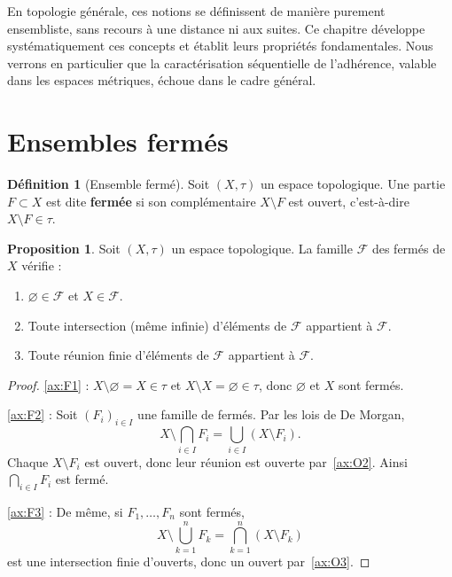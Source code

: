 \documentclass[12pt,a4paper,openany]{book}
\theoremstyle{definition}
\newtheorem{definition}{Définition}[chapter]
\theoremstyle{cours}
\newtheorem{proposition}[theoreme]{Proposition}
\theoremstyle{coursnormal}
\begin{document}
En topologie générale, ces notions se définissent de manière purement ensembliste, sans recours à une distance ni aux suites. Ce chapitre développe systématiquement ces concepts et établit leurs propriétés fondamentales. Nous verrons en particulier que la caractérisation séquentielle de l'adhérence, valable dans les espaces métriques, échoue dans le cadre général.

\section{Ensembles fermés}
\label{sec:fermes}

\begin{definition}[Ensemble fermé]\label{def:ferme}
  Soit $(X,\tau)$ un espace topologique. Une partie $F \subset X$ est dite \textbf{fermée} si son complémentaire $X \setminus F$ est ouvert, c'est-à-dire $X \setminus F \in \tau$.
\end{definition}

\begin{proposition}\label{prop:proprietes-fermes}
  Soit $(X,\tau)$ un espace topologique. La famille $\mathcal{F}$ des fermés de $X$ vérifie :
  \begin{enumerate}[label=\textbf{(F\arabic*)}]
    \item\label{ax:F1} $\varnothing \in \mathcal{F}$ et $X \in \mathcal{F}$.
    \item\label{ax:F2} Toute intersection (même infinie) d'éléments de $\mathcal{F}$ appartient à $\mathcal{F}$.
    \item\label{ax:F3} Toute réunion finie d'éléments de $\mathcal{F}$ appartient à $\mathcal{F}$.
  \end{enumerate}
\end{proposition}

\begin{proof}
  \ref{ax:F1} : $X \setminus \varnothing = X \in \tau$ et $X \setminus X = \varnothing \in \tau$, donc $\varnothing$ et $X$ sont fermés.

  \ref{ax:F2} : Soit $(F_i)_{i \in I}$ une famille de fermés. Par les lois de De Morgan,
  \[
    X \setminus \bigcap_{i \in I} F_i = \bigcup_{i \in I} (X \setminus F_i).
  \]
  Chaque $X \setminus F_i$ est ouvert, donc leur réunion est ouverte par~\ref{ax:O2}. Ainsi $\bigcap_{i \in I} F_i$ est fermé.

  \ref{ax:F3} : De même, si $F_1, \ldots, F_n$ sont fermés,
  \[
    X \setminus \bigcup_{k=1}^n F_k = \bigcap_{k=1}^n (X \setminus F_k)
  \]
  est une intersection finie d'ouverts, donc un ouvert par~\ref{ax:O3}.
\end{proof}
\end{document}
